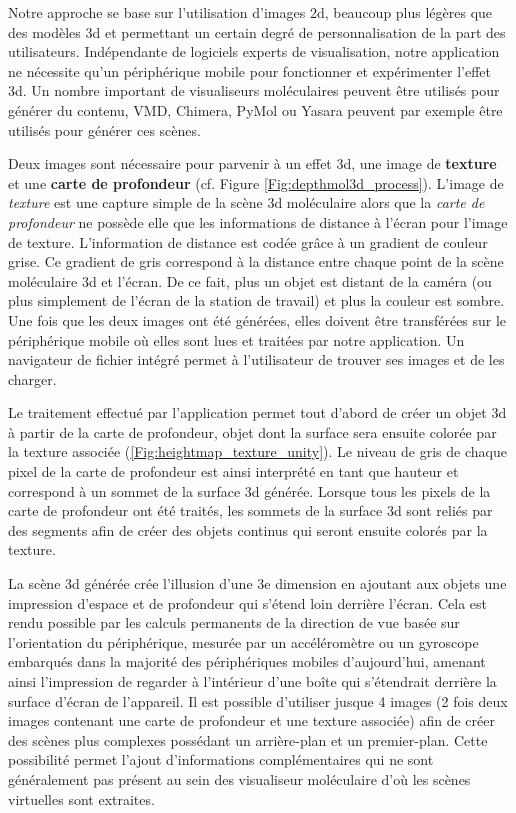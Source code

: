 Notre approche se base sur l'utilisation d'images 2d, beaucoup plus légères que des modèles 3d et permettant un certain degré de personnalisation de la part des utilisateurs. Indépendante de logiciels experts de visualisation, notre application ne nécessite qu'un périphérique mobile pour fonctionner et expérimenter l'effet 3d. Un nombre important de visualiseurs moléculaires peuvent être utilisés pour générer du contenu, VMD, Chimera, PyMol ou Yasara peuvent par exemple être utilisés pour générer ces scènes.

Deux images sont nécessaire pour parvenir à un effet 3d, une image de \textbf{texture} et une \textbf{carte de profondeur} (cf. Figure \ref{Fig:depthmol3d_process}). L'image de \textit{texture} est une capture simple de la scène 3d moléculaire alors que la \textit{carte de profondeur} ne possède elle que les informations de distance à l'écran pour l'image de texture. L'information de distance est codée grâce à un gradient de couleur grise. Ce gradient de gris correspond à la distance entre chaque point de la scène moléculaire 3d et l'écran. De ce fait, plus un objet est distant de la caméra (ou plus simplement de l'écran de la station de travail) et plus la couleur est sombre. Une fois que les deux images ont été générées, elles doivent être transférées sur le périphérique mobile où elles sont lues et traitées par notre application. Un navigateur de fichier intégré permet à l'utilisateur de trouver ses images et de les charger. 

Le traitement effectué par l'application permet tout d'abord de créer un objet 3d à partir de la carte de profondeur, objet dont la surface sera ensuite colorée par la texture associée (\ref{Fig:heightmap_texture_unity}). Le niveau de gris de chaque pixel de la carte de profondeur est ainsi interprété en tant que hauteur et correspond à un sommet de la surface 3d générée. Lorsque tous les pixels de la carte de profondeur ont été traités, les sommets de la surface 3d sont reliés par des segments afin de créer des objets continus qui seront ensuite colorés par la texture.

La scène 3d générée crée l'illusion d'une 3e dimension en ajoutant aux objets une impression d'espace et de profondeur qui s'étend loin derrière l'écran. Cela est rendu possible par les calculs permanents de la direction de vue basée sur l'orientation du périphérique, mesurée par un accéléromètre ou un gyroscope embarqués dans la majorité des périphériques mobiles d'aujourd'hui, amenant ainsi l'impression de regarder à l'intérieur d'une boîte qui s'étendrait derrière la surface d'écran de l'appareil.
Il est possible d'utiliser jusque 4 images (2 fois deux images contenant une carte de profondeur et une texture associée) afin de créer des scènes plus complexes possédant un arrière-plan et un premier-plan. Cette possibilité permet l'ajout d'informations complémentaires qui ne sont généralement pas présent au sein des visualiseur moléculaire d'où les scènes virtuelles sont extraites.

